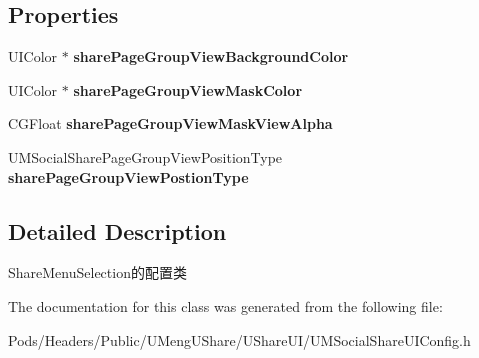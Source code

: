 \subsection*{Properties}
\begin{DoxyCompactItemize}
\item 
\mbox{\label{interface_u_m_social_share_page_group_view_config_a77f8d28219423c3f7815ac381f9122e9}} 
U\+I\+Color $\ast$ {\bfseries share\+Page\+Group\+View\+Background\+Color}
\item 
\mbox{\label{interface_u_m_social_share_page_group_view_config_a91e8752c5fe278ccd36980a7240dc902}} 
U\+I\+Color $\ast$ {\bfseries share\+Page\+Group\+View\+Mask\+Color}
\item 
\mbox{\label{interface_u_m_social_share_page_group_view_config_a0b628f229fea50ed4cb018fb97f1c9d2}} 
C\+G\+Float {\bfseries share\+Page\+Group\+View\+Mask\+View\+Alpha}
\item 
\mbox{\label{interface_u_m_social_share_page_group_view_config_aaca6e43f3107444a6c17ce61f3cd429a}} 
U\+M\+Social\+Share\+Page\+Group\+View\+Position\+Type {\bfseries share\+Page\+Group\+View\+Postion\+Type}
\end{DoxyCompactItemize}


\subsection{Detailed Description}
Share\+Menu\+Selection的配置类 

The documentation for this class was generated from the following file\+:\begin{DoxyCompactItemize}
\item 
Pods/\+Headers/\+Public/\+U\+Meng\+U\+Share/\+U\+Share\+U\+I/U\+M\+Social\+Share\+U\+I\+Config.\+h\end{DoxyCompactItemize}
